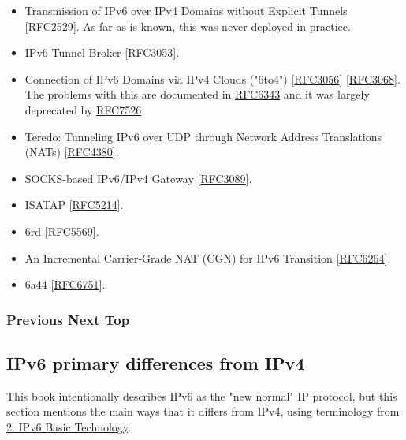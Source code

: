 \documentclass[
]{article}
\begin{document}
\begin{itemize}
\item
  Transmission of IPv6 over IPv4 Domains without Explicit Tunnels
  {[}\href{https://www.rfc-editor.org/info/rfc2529}{RFC2529}{]}. As far
  as is known, this was never deployed in practice.
\item
  IPv6 Tunnel Broker
  {[}\href{https://www.rfc-editor.org/info/rfc3053}{RFC3053}{]}.
\item
  Connection of IPv6 Domains via IPv4 Clouds ("6to4")
  {[}\href{https://www.rfc-editor.org/info/rfc3056}{RFC3056}{]}
  {[}\href{https://www.rfc-editor.org/info/rfc3068}{RFC3068}{]}. The
  problems with this are documented in
  \href{https://www.rfc-editor.org/info/rfc6343}{RFC6343} and it was
  largely deprecated by
  \href{https://www.rfc-editor.org/info/rfc7526}{RFC7526}.
\item
  Teredo: Tunneling IPv6 over UDP through Network Address Translations
  (NATs) {[}\href{https://www.rfc-editor.org/info/rfc4380}{RFC4380}{]}.
\item
  SOCKS-based IPv6/IPv4 Gateway
  {[}\href{https://www.rfc-editor.org/info/rfc3089}{RFC3089}{]}.
\item
  ISATAP {[}\href{https://www.rfc-editor.org/info/rfc5214}{RFC5214}{]}.
\item
  6rd {[}\href{https://www.rfc-editor.org/info/rfc5569}{RFC5569}{]}.
\item
  An Incremental Carrier-Grade NAT (CGN) for IPv6 Transition
  {[}\href{https://www.rfc-editor.org/info/rfc6264}{RFC6264}{]}.
\item
  6a44 {[}\href{https://www.rfc-editor.org/info/rfc6751}{RFC6751}{]}.
\end{itemize}

\subsubsection{\texorpdfstring{\hyperref[translation-and-ipv4-as-a-service]{Previous}
\hyperref[ipv6-primary-differences-from-ipv4]{Next}
\hyperref[coexistence-with-legacy-ipv4]{Top}}{Previous Next Top}}\label{previous-next-top-19}

\pagebreak

\subsection{IPv6 primary differences from
IPv4}\label{ipv6-primary-differences-from-ipv4}

This book intentionally describes IPv6 as the "new normal" IP protocol,
but this section mentions the main ways that it differs from IPv4, using
terminology from \hyperref[ipv6-basic-technology]{2. IPv6 Basic
Technology}.
\end{document}
